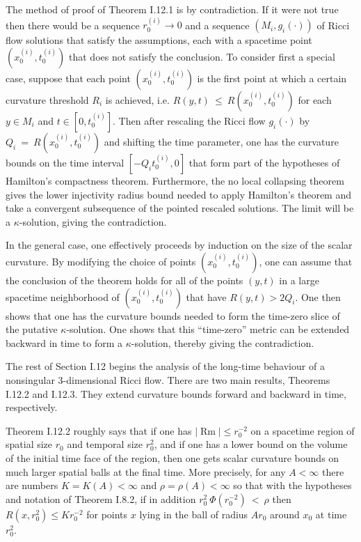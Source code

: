 \documentclass[12pt]{amsart}
\newcommand{\Rm}{\operatorname{Rm}}
\numberwithin{equation}{section}
\theoremstyle{plain}
\theoremstyle{definition}
\theoremstyle{remark}
\begin{document}
The method of proof of Theorem I.12.1 is by contradiction. If it were not
true then there would be a sequence $r_0^{(i)} \rightarrow 0$ and 
a sequence 
$(M_i, g_i(\cdot))$ of
Ricci flow solutions that satisfy the assumptions, each with a spacetime point
$\left( x^{(i)}_0, t^{(i)}_0 \right)$ that does not satisfy the conclusion. To consider
first a special
case,
suppose that each point $\left( x^{(i)}_0, t^{(i)}_0 \right)$ 
is the first point at which a certain curvature threshold $R_i$ is
achieved, i.e.
$R(y, t) \: \le \: R \left( x^{(i)}_0, t^{(i)}_0 \right)$ for each
$y \in M_i$ and $t \in \left[ 0,  t^{(i)}_0 \right]$.
Then after rescaling the Ricci flow
$g_i(\cdot)$ by $Q_i \: = \: R \left( x^{(i)}_0, t^{(i)}_0 \right)$ and shifting the
time parameter, one has the curvature bounds on the time interval
$[- Q_i t^{(i)}_0,0]$ that form part of  the
hypotheses of Hamilton's compactness theorem.  Furthermore, the
no local collapsing theorem gives the lower injectivity radius bound
needed to apply Hamilton's theorem and take a convergent subsequence of the pointed 
rescaled solutions.
The limit will be a $\kappa$-solution, giving the contradiction.

In the general case, one effectively proceeds by induction on the size of the
scalar curvature.  By modifying the choice of points $\left( x^{(i)}_0, t^{(i)}_0 \right)$,
one can assume that the conclusion of the theorem holds for all of the points $(y,t)$ in a
large spacetime neighborhood of $\left( x^{(i)}_0, t^{(i)}_0 \right)$
that have $R(y,t) > 2Q_i$. One then shows that one has the curvature bounds
needed to form the time-zero slice of the putative $\kappa$-solution. One shows
that this ``time-zero'' metric can be extended backward in time to form a
$\kappa$-solution, thereby giving the contradiction.

The rest of Section I.12 begins the analysis of the long-time behaviour of
a nonsingular $3$-dimensional Ricci flow. There are two main results,
Theorems I.12.2 and I.12.3. They extend curvature bounds forward and
backward in time, respectively.  

Theorem I.12.2 roughly says that if
one has $|\Rm| \le r_0^{-2}$ on a spacetime region of spatial
size $r_0$ and temporal size $r_0^2$, and if one has a lower bound on the
volume of the initial time face of the region, then one gets scalar curvature
bounds on much larger spatial balls at the final time. More precisely,
for any $A < \infty$
there are numbers $K = K(A) < \infty$ and
$\rho = \rho(A) < \infty$ so that with the
hypotheses and notation of Theorem I.8.2, if in addition 
$r_0^2 \: \Phi(r_0^{-2}) \: < \: \rho$
then
$R(x, r_0^2) \le K r_0^{-2}$ for points $x$ lying in the ball of 
radius $Ar_0$ 
around $x_0$
at time $r_0^2$.
\end{document}
